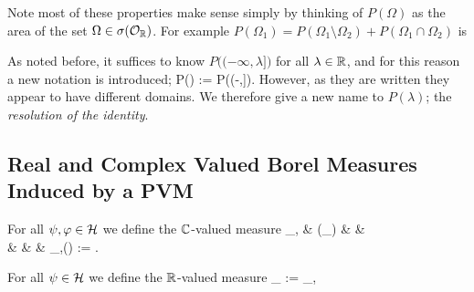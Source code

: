 Note most of these properties make sense simply by thinking of $P(\Omega)$ as the area of the set $\Omega\in\sigma(\mathcal{O}_{\mathbb{R}})$. For example $P(\Omega_1) = P(\Omega_1\setminus\Omega_2) + P(\Omega_1\cap\Omega_2)$ is

\begin{center}
\end{center}

\br
As noted before, it suffices to know $P\big((-\infty,\lambda]\big)$ for all $\lambda \in \mathbb{R}$, and for this reason a new notation is introduced; \bse
P(\lambda) := P\big((-\infty,\lambda]\big).
\ese 
However, as they are written they appear to have different domains. We therefore give a new name to $P(\lambda)$; the \emph{resolution of the identity}. 
\er

\subsection{Real and Complex Valued Borel Measures Induced by a PVM}

\bd 
For all $\psi,\varphi\in\mathcal{H}$ we define the $\mathbb{C}$-valued measure 
\mu_{\psi,\varphi} \cl & \sigma(\cO_{\R}) & \to & \C\\
& \Omega  & \mapsto & \mu_{\psi,\varphi}(\Omega) := .
\ei
\ed 

\bd 
For all $\psi\in\mathcal{H}$ we define the $\mathbb{R}$-valued measure
\bse 
\mu_{\psi} := \mu_{\psi,\psi}
\ese 
\ed 

